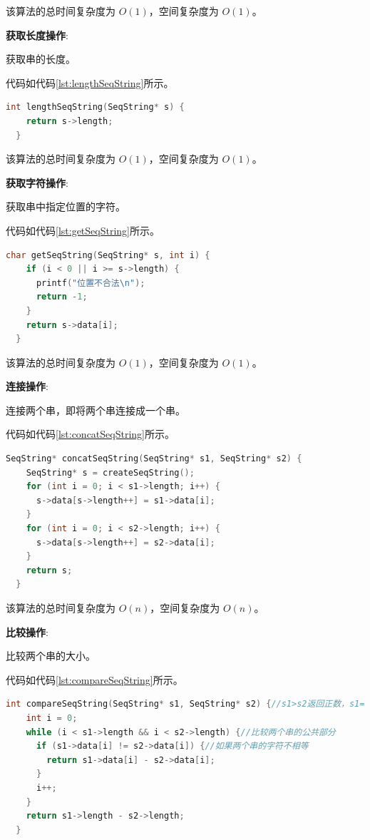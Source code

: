 \documentclass[lang=cn,newtx,10pt,scheme=chinese]{../elegantbook}
\begin{document}
该算法的总时间复杂度为 $O(1)$，空间复杂度为 $O(1)$。


\textbf{获取长度操作}:

获取串的长度。

代码如代码\ref{lst:lengthSeqString}所示。

\begin{lstlisting}[language=C++, caption={获取串的长度示例代码}, label={lst:lengthSeqString}]
  int lengthSeqString(SeqString* s) {
    return s->length;
  }

\end{lstlisting}

该算法的总时间复杂度为 $O(1)$，空间复杂度为 $O(1)$。


\textbf{获取字符操作}:

获取串中指定位置的字符。

代码如代码\ref{lst:getSeqString}所示。

\begin{lstlisting}[language=C++, caption={获取串中指定位置的字符示例代码}, label={lst:getSeqString}]
  char getSeqString(SeqString* s, int i) {
    if (i < 0 || i >= s->length) {
      printf("位置不合法\n");
      return -1;
    }
    return s->data[i];
  }

\end{lstlisting}

该算法的总时间复杂度为 $O(1)$，空间复杂度为 $O(1)$。


\textbf{连接操作}:

连接两个串，即将两个串连接成一个串。

代码如代码\ref{lst:concatSeqString}所示。

\begin{lstlisting}[language=C++, caption={连接两个串示例代码}, label={lst:concatSeqString}]
  SeqString* concatSeqString(SeqString* s1, SeqString* s2) {
    SeqString* s = createSeqString();
    for (int i = 0; i < s1->length; i++) {
      s->data[s->length++] = s1->data[i];
    }
    for (int i = 0; i < s2->length; i++) {
      s->data[s->length++] = s2->data[i];
    }
    return s;
  }

\end{lstlisting}

该算法的总时间复杂度为 $O(n)$，空间复杂度为 $O(n)$。


\textbf{比较操作}:

比较两个串的大小。

代码如代码\ref{lst:compareSeqString}所示。

\begin{lstlisting}[language=C++, caption={比较两个串的大小示例代码}, label={lst:compareSeqString}]
  int compareSeqString(SeqString* s1, SeqString* s2) {//s1>s2返回正数，s1=s2返回0，s1<s2返回负数
    int i = 0;
    while (i < s1->length && i < s2->length) {//比较两个串的公共部分
      if (s1->data[i] != s2->data[i]) {//如果两个串的字符不相等
        return s1->data[i] - s2->data[i];
      }
      i++;
    }
    return s1->length - s2->length;
  }

\end{lstlisting}
\end{document}
